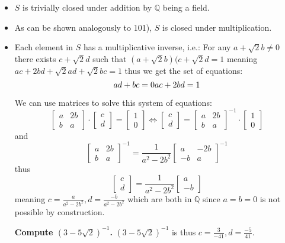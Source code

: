 \documentclass[
]{article}
\begin{document}
\begin{itemize}
\item
  \(S\) is trivially closed under addition by \(\mathbb{Q}\) being a
  field.
\item
  As can be shown analogously to 101), \(S\) is closed under
  multiplication.
\item
  Each element in \(S\) has a multiplicative inverse, i.e.: For any
  \(a+ \sqrt{2}b \neq 0\) there exists \(c + \sqrt{2}d\) such that
  \((a+\sqrt{2}b)(c + \sqrt{2}d = 1\) meaning
  \(ac + 2bd + \sqrt{2}ad + \sqrt{2}bc = 1\) thus we get the set of
  equations: \[
    ad + bc = 0\\
    ac + 2bd = 1
    \]

  We can use matrices to solve this system of equations: \[
    \begin{bmatrix}
    a & 2b\\
    b & a
    \end{bmatrix} \cdot \begin{bmatrix}
    c \\
    d 
    \end{bmatrix} = \begin{bmatrix}
    1 \\
    0
    \end{bmatrix}
    \iff \begin{bmatrix}
    c\\
    d 
    \end{bmatrix}=
    \begin{bmatrix}
    a & 2b\\
    b & a
    \end{bmatrix}^{-1} \cdot
    \begin{bmatrix}
    1 \\
    0
    \end{bmatrix}
    \] and \[
    \begin{bmatrix}
    a & 2b\\
    b & a
    \end{bmatrix}^{-1} = \frac{1}{a^2-2b^2}\begin{bmatrix}
    a & -2b\\
    -b & a
    \end{bmatrix}^{-1}
    \] thus \[
    \begin{bmatrix}
    c \\
    d 
    \end{bmatrix} = \frac{1}{a^2-2b^2} \begin{bmatrix}
    a \\
    -b 
    \end{bmatrix}
    \] meaning \(c = \frac{a}{a^2-2b^2}, d = \frac{-b}{a^2-2b^2}\) which
  are both in \(\mathbb{Q}\) since \(a = b = 0\) is not possible by
  construction.

  \textbf{Compute \((3-5\sqrt{2})^{-1}\).} \((3-5\sqrt{2})^{-1}\) is
  thus \(c = \frac{3}{-41}, d = \frac{-5}{41}\).
\end{itemize}
\end{document}
